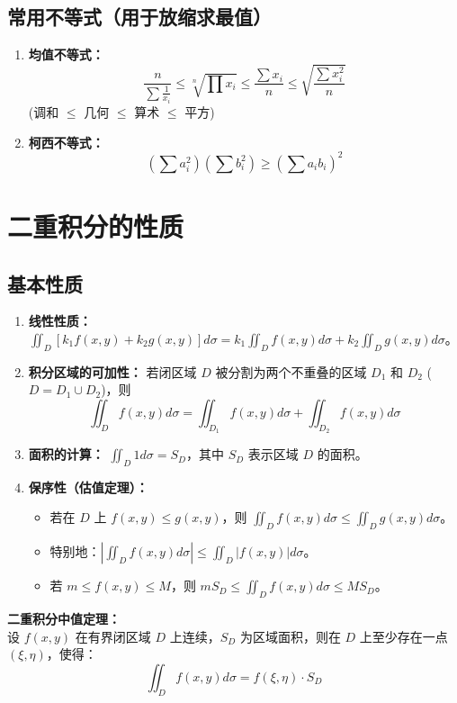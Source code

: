 \documentclass[a4paper,12pt]{ctexart}
\newenvironment{purplebox}
  {\begin{tcolorbox}[colback=white, colframe=boxpurple, boxrule=1pt, sharp corners, title=\textbf{定义/定理/核心公式}]}
  {\end{tcolorbox}}
\begin{document}
\subsection{常用不等式（用于放缩求最值）}
\begin{enumerate}
    \item \textbf{均值不等式：}
    \[ \frac{n}{\sum \frac{1}{x_i}} \le \sqrt[n]{\prod x_i} \le \frac{\sum x_i}{n} \le \sqrt{\frac{\sum x_i^2}{n}} \]
    (调和 $\le$ 几何 $\le$ 算术 $\le$ 平方)
    \item \textbf{柯西不等式：}
    \[ (\sum a_i^2)(\sum b_i^2) \ge (\sum a_i b_i)^2 \]
\end{enumerate}
\newpage

\section{二重积分的性质}

\subsection{基本性质}
\begin{enumerate}
    \item \textbf{线性性质：} $\iint_D [k_1 f(x,y) + k_2 g(x,y)] d\sigma = k_1 \iint_D f(x,y) d\sigma + k_2 \iint_D g(x,y) d\sigma$。
    \item \textbf{积分区域的可加性：} 若闭区域 $D$ 被分割为两个不重叠的区域 $D_1$ 和 $D_2$ ($D = D_1 \cup D_2$)，则
    \[ \iint_D f(x,y) d\sigma = \iint_{D_1} f(x,y) d\sigma + \iint_{D_2} f(x,y) d\sigma \]
    \item \textbf{面积的计算：} $\iint_D 1 d\sigma = S_D$，其中 $S_D$ 表示区域 $D$ 的面积。
    \item \textbf{保序性（估值定理）：} 
    \begin{itemize}
        \item 若在 $D$ 上 $f(x,y) \le g(x,y)$，则 $\iint_D f(x,y) d\sigma \le \iint_D g(x,y) d\sigma$。
        \item 特别地：$|\iint_D f(x,y) d\sigma| \le \iint_D |f(x,y)| d\sigma$。
        \item 若 $m \le f(x,y) \le M$，则 $m S_D \le \iint_D f(x,y) d\sigma \le M S_D$。
    \end{itemize}
\end{enumerate}

\begin{purplebox}
    \textbf{二重积分中值定理：} \\
    设 $f(x,y)$ 在有界闭区域 $D$ 上连续，$S_D$ 为区域面积，则在 $D$ 上至少存在一点 $(\xi, \eta)$，使得：
    \[ \iint_D f(x,y) d\sigma = f(\xi, \eta) \cdot S_D \]
\end{purplebox}
\end{document}

